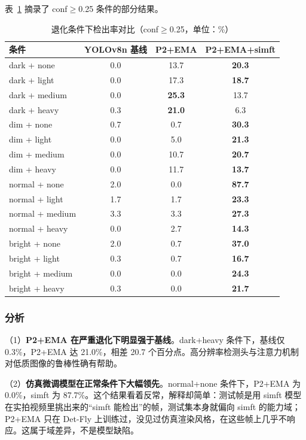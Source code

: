 表~\ref{tab:e4} 摘录了 conf$\ge$0.25 条件的部分结果。

\begin{table}[htbp]
\centering
\caption{退化条件下检出率对比（conf$\ge$0.25，单位：\%）}
\label{tab:e4}
\small
\begin{tabular}{lccc}
\toprule
\textbf{条件} & \textbf{YOLOv8n 基线} & \textbf{P2+EMA} & \textbf{P2+EMA+simft} \\
\midrule
dark + none & 0.0 & 13.7 & \textbf{20.3} \\
dark + light & 0.0 & 17.3 & \textbf{18.7} \\
dark + medium & 0.0 & \textbf{25.3} & 13.7 \\
dark + heavy & 0.3 & \textbf{21.0} & 6.3 \\
dim + none & 0.7 & 0.7 & \textbf{30.3} \\
dim + light & 0.0 & 5.0 & \textbf{21.3} \\
dim + medium & 0.0 & 10.7 & \textbf{20.7} \\
dim + heavy & 0.0 & 11.7 & \textbf{13.7} \\
normal + none & 2.0 & 0.0 & \textbf{87.7} \\
normal + light & 1.7 & 1.7 & \textbf{23.3} \\
normal + medium & 3.3 & 3.3 & \textbf{27.3} \\
normal + heavy & 0.0 & 2.7 & \textbf{14.3} \\
bright + none & 2.0 & 0.7 & \textbf{37.0} \\
bright + light & 0.3 & 0.7 & \textbf{16.7} \\
bright + medium & 0.0 & 0.0 & \textbf{24.3} \\
bright + heavy & 0.3 & 0.0 & \textbf{21.7} \\
\bottomrule
\end{tabular}
\end{table}

\subsubsection{分析}

（1）\textbf{P2+EMA 在严重退化下明显强于基线}。dark+heavy 条件下，基线仅 0.3\%，P2+EMA 达 21.0\%，相差 20.7 个百分点。高分辨率检测头与注意力机制对低质图像的鲁棒性确有帮助。

（2）\textbf{仿真微调模型在正常条件下大幅领先}。normal+none 条件下，P2+EMA 为 0.0\%，simft 为 87.7\%。这个结果看着反常，解释却简单：测试帧是用 simft 模型在实拍视频里挑出来的“simft 能检出”的帧，测试集本身就偏向 simft 的能力域；P2+EMA 只在 Det-Fly 上训练过，没见过仿真渲染风格，在这些帧上几乎不响应。这属于域差异，不是模型缺陷。

